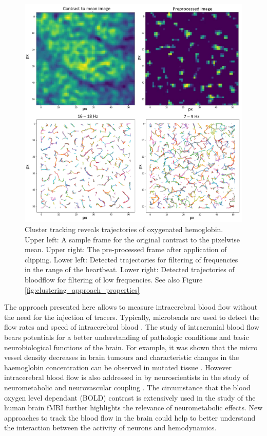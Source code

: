 \begin{figure}[!htb]
\centering
\includegraphics[width=\textwidth,height=\textheight,keepaspectratio]{Figures/clustering_approach_results}
\decoRule
\caption[Cluster tracking reveals trajectories of oxygenated hemoglobin]{Cluster tracking reveals trajectories of oxygenated hemoglobin.\\
Upper left: A sample frame for the original contrast to the pixelwise mean. Upper right: The pre-processed frame after application of clipping. Lower left: Detected trajectories for filtering of frequencies in the range of the heartbeat. Lower right: Detected trajectories of bloodflow for filtering of low frequencies. See also Figure \ref{fig:clustering_approach_properties}}
\label{fig:clustering_approach_results}
\end{figure}
The approach presented here allows to measure intracerebral blood flow without the need for the injection of tracers. Typically, microbeads are used to detect the flow rates and speed of intracerebral blood \parencite{kim2019development}. The study of intracranial blood flow bears potentials for a better understanding of pathologic conditions and basic neurobiological functions of the brain. For example, it was shown that the micro vessel density decreases in brain tumours and characteristic changes in the haemoglobin concentration can be observed in mutated tissue \parencite{lee2014vivo}. However intracerebral blood flow is also addressed in by neuroscientists in the study of neurometabolic and neurovascular coupling \parencite{devor2012frontiers}. The circumstance that the blood oxygen level dependant (BOLD) contrast is extensively used in the study of the human brain fMRI further highlights the relevance of neurometabolic effects. New approaches to track the blood flow in the brain could help to better understand the interaction between the activity of neurons and hemodynamics.\\
